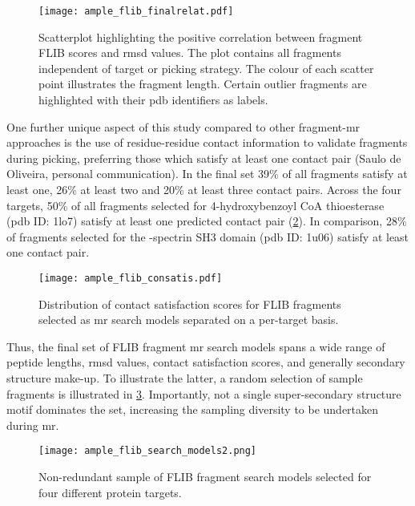 \begin{figure}[H]
	\centering
	\texttt{[image: ample\_flib\_finalrelat.pdf]}
	\caption[Correlation analysis for final FLIB \gls{mr} fragments]{Scatterplot highlighting the positive correlation between fragment FLIB scores and \gls{rmsd} values. The plot contains all fragments independent of target or picking strategy. The colour of each scatter point illustrates the fragment length. Certain outlier fragments are highlighted with their \gls{pdb} identifiers as labels.}
	\label{fig:ample_flib_finalrelat}
\end{figure}

One further unique aspect of this study compared to other fragment-\gls{mr} approaches is the use of residue-residue contact information to validate fragments during picking, preferring those which satisfy at least one contact pair (Saulo de Oliveira, personal communication). In the final set 39\% of all fragments satisfy at least one, 26\% at least two and 20\% at least three contact pairs. Across the four targets, 50\% of all fragments selected for 4-hydroxybenzoyl CoA thioesterase (\gls{pdb} ID: 1lo7) satisfy at least one predicted contact pair (\cref{fig:ample_flib_consatis}). In comparison, 28\% of fragments selected for the \textalpha-spectrin SH3 domain (\gls{pdb} ID: 1u06) satisfy at least one contact pair.

\begin{figure}[H]
	\centering
	\texttt{[image: ample\_flib\_consatis.pdf]}
	\caption[Distribution of contact satisfaction scores for FLIB fragments]{Distribution of contact satisfaction scores for FLIB fragments selected as \gls{mr} search models separated on a per-target basis.}
	\label{fig:ample_flib_consatis}
\end{figure}

Thus, the final set of FLIB fragment \gls{mr} search models spans a wide range of peptide lengths, \gls{rmsd} values, contact satisfaction scores, and generally secondary structure make-up. To illustrate the latter, a random selection of sample fragments is illustrated in \cref{fig:ample_flib_search_models}. Importantly, not a single super-secondary structure motif dominates the set, increasing the sampling diversity to be undertaken during \gls{mr}.

\begin{figure}[H]
	\centering
	\texttt{[image: ample\_flib\_search\_models2.png]}
	\caption[Fragment search models derived from FLIB]{Non-redundant sample of FLIB fragment search models selected for four different protein targets.}
	\label{fig:ample_flib_search_models}
\end{figure}

